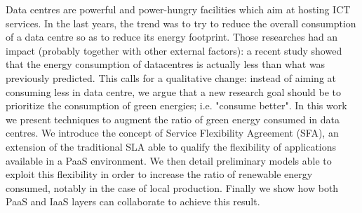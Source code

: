 
Data centres are powerful and power-hungry facilities which aim at hosting ICT services.
In the last years, the trend was to try to reduce the overall consumption of a data centre so as to reduce its energy footprint.
Those researches had an impact (probably together with other external factors): a recent study showed that the energy consumption of datacentres is actually less than what was previously predicted.
This calls for a qualitative change: instead of aiming at consuming less in data centre, we argue that a new research goal should be to prioritize the consumption of green energies; i.e. "consume better".
In this work we present techniques to augment the ratio of green energy consumed in data centres.
We introduce the concept of Service Flexibility Agreement (SFA), an extension of the traditional SLA able to qualify the flexibility of applications available in a PaaS environment.
We then detail preliminary models able to exploit this flexibility in order to increase the ratio of renewable energy consumed, notably in the case of local production. 
Finally we show how both PaaS and IaaS layers can collaborate to achieve this result.






